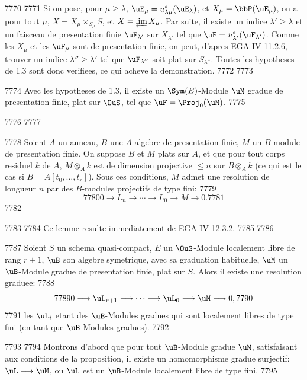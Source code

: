   7770	
  7771	Si on pose, pour $\mu \geqslant \lambda$, $\uE_\mu = u_{\lambda\mu}^*(\uE_\lambda)$, et $X_\mu = \bbP(\uE_\mu)$, on a pour tout $\mu$, $X = X_\mu \times_{S_\mu} S$, et $X = \varprojlim X_\mu$. Par suite, il existe un indice $\lambda' \geqslant \lambda$ et un faisceau de presentation finie $\uF_{\lambda'}$ sur $X_{\lambda'}$ tel que $\uF = u_{\lambda'}^*(\uF_{\lambda'})$. Comme les $X_\mu$ et les $\uF_\mu$ sont de presentation finie, on peut, d'apres EGA IV 11.2.6, trouver un indice $\lambda'' \geqslant \lambda'$ tel que $\uF_{\lambda''}$ soit plat sur $S_{\lambda''}$. Toutes les hypotheses de 1.3 sont donc verifiees, ce qui acheve la demonstration.
  7772	
  7773	\begin{cor}
  7774	Avec les hypotheses de 1.3, il existe un $\Sym(E)$-Module $\uM$ gradue de presentation finie, plat sur $\OuS$, tel que $\uF = \Proj_0(\uM)$.
  7775	\end{cor}
  7776	
  7777	\begin{lem}
  7778	Soient $A$ un anneau, $B$ une $A$-algebre de presentation finie, $M$ un $B$-module de presentation finie. On suppose $B$ et $M$ plats sur $A$, et que pour tout corps residuel $k$ de $A$, $M \otimes_A k$ est de dimension projective $\leqslant n$ sur $B \otimes_A k$ (ce qui est le cas si $B = A[t_0, \ldots, t_r]$). Sous ces conditions, $M$ admet une resolution de longueur $n$ par des $B$-modules projectifs de type fini:
  7779	\[
  7780	0 \longrightarrow L_n \longrightarrow \cdots \longrightarrow L_0 \longrightarrow M \longrightarrow 0.
  7781	\]
  7782	\end{lem}
  7783	
  7784	Ce lemme resulte immediatement de EGA IV 12.3.2.
  7785	
  7786	\begin{prop}
  7787	Soient $S$ un schema quasi-compact, $E$ un $\OuS$-Module localement libre de rang $r+1$, $\uB$ son algebre symetrique, avec sa graduation habituelle, $\uM$ un $\uB$-Module gradue de presentation finie, plat sur $S$. Alors il existe une resolution graduee:
  7788	\[
  7789	0 \longrightarrow \uL_{r+1} \longrightarrow \cdots \longrightarrow \uL_0 \longrightarrow \uM \longrightarrow 0,
  7790	\]
  7791	les $\uL_i$ etant des $\uB$-Modules gradues qui sont localement libres de type fini (en tant que $\uB$-Modules gradues).
  7792	\end{prop}
  7793	
  7794	Montrons d'abord que pour tout $\uB$-Module gradue $\uM$, satisfaisant aux conditions de la proposition, il existe un homomorphisme gradue surjectif: $\uL \longrightarrow \uM$, ou $\uL$ est un $\uB$-Module localement libre de type fini.
  7795	
